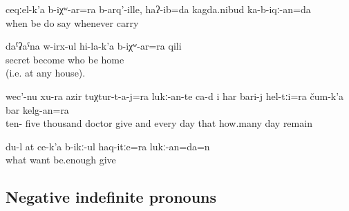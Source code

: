 \begin{exe}
	\ex	\label{ex:Whenever I make it, I will bring it, I said}
	\gll	ceqːel-k'a	b-iχʷ-ar=ra	b-arq'-ille,	haʔ-ib=da	kagda.nibud	ka-b-iqː-an=da\\
		when	be	do	say		whenever	carry\\
	\glt	{}

	\ex	\label{ex:He was hiding himself at the house of whomever. (at any house)}
	\gll	daˁʡaˁna	w-irx-ul	hi-la-k'a	b-iχʷ-ar=ra	qili\\
		secret	become	who	be	home\\
	\glt	{} (i.e. at any house).

	\ex	\label{ex:15000 needs to be given to the doctors and every day these (i.e. this amount of money), however many days you stay}
	\gll	wec'-nu	xu-ra	azir	tuχtur-t-a-j=ra	lukː-an-te	ca-d	i	har	bari-j	hel-tːi=ra	čum-k'a	bar	kelg-an=ra\\
		ten-	five	thousand doctor give 	and	every	day that	how.many day	remain\\
	\glt	{}

	\ex	\label{ex:I will give you whatever you can want}
	\gll	du-l	at	ce-k'a	b-ikː-ul	haq-itːe=ra	lukː-an=da=n\\
				what	want	be.enough	give\\
	\glt	{}
\end{exe}



\subsection{Negative indefinite pronouns}
\label{ssec:Negative indefinite pronouns}

